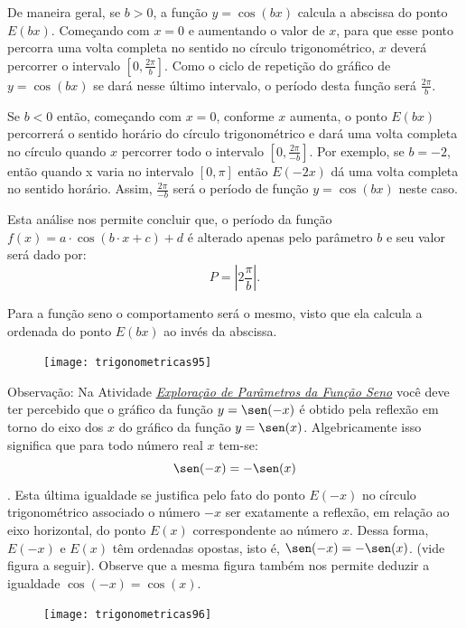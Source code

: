De maneira geral, se $b >0$, a função $y = \cos(bx)$ calcula a abscissa do ponto $E(bx)$. Começando com $x = 0$ e aumentando o valor de $x$, para que esse ponto percorra uma volta completa no sentido no círculo trigonométrico, $x$ deverá percorrer o intervalo $[0, \frac{2\pi}{b}]$. Como o ciclo de repetição do gráfico de $y = \cos(bx)$ se dará nesse último intervalo, o período desta função será $\frac{2\pi}{b}$.

Se $b < 0$ então, começando com $x = 0$, conforme $x$ aumenta, o ponto $E(bx)$ percorrerá o sentido horário do círculo trigonométrico e dará uma volta completa no círculo quando $x$ percorrer todo o intervalo $[0,  \frac{2\pi}{-b}]$. Por exemplo, se $b = -2$, então quando x varia no intervalo $[0, \pi]$ então $E(-2x)$ dá uma volta completa no sentido horário. Assim, $\frac{2\pi}{-b}$ será o período de função $y = \cos(bx)$ neste caso.

Esta análise nos permite concluir que, o período da função $f(x)=a\cdot\cos(b\cdot x+c)+d$ é alterado apenas pelo parâmetro $b$ e seu valor será dado por:
\begin{equation*}
P = |2 \frac{\pi}{b}|.
\end{equation*}

Para a função seno o comportamento será o mesmo, visto que ela calcula a ordenada do ponto $E(bx)$ ao invés da abscissa.	

\begin{figure}[H]
\centering

\texttt{[image: trigonometricas95]}
\end{figure}

Observação: Na Atividade \hyperref[trig-ativ18]{\textit{Exploração de Parâmetros da Função Seno}} você deve ter percebido que o gráfico da função $y = \sen(-x)$ é obtido pela reflexão em torno do eixo dos $x$ do gráfico da função $y = \sen(x)$. Algebricamente isso significa que para todo número real $x$ tem-se:
\begin{equation*}
\sen(-x) = -\sen(x)
\end{equation*}.
Esta última igualdade se justifica pelo fato do ponto $E(-x)$ no círculo trigonométrico associado o número $-x$ ser exatamente a reflexão, em relação ao eixo horizontal, do ponto $E(x)$ correspondente ao número $x$. Dessa forma, $E(-x)$ e $E(x)$ têm ordenadas opostas, isto é, $\sen(-x) = -\sen(x)$. (vide figura a seguir). Observe que a mesma figura também nos permite deduzir a igualdade $\cos(-x) = \cos(x)$.

\begin{figure}[H]
\centering

\texttt{[image: trigonometricas96]}
\end{figure}


